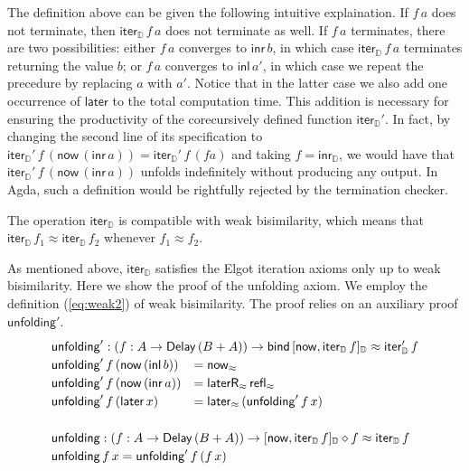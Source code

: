\documentclass[runningheads,a4paper]{llncs}
\newcommand{\inl}{\mathsf{inl}}
\newcommand{\inr}{\mathsf{inr}}
\newcommand{\Delay}{\ensuremath{\mathsf{Delay}\,}}
\newcommand{\now}{\mathsf{now}}
\newcommand{\later}{\mathsf{later}}
\newcommand{\laterR}{\mathsf{laterR}}
\newcommand{\bind}{\mathsf{bind}}
\newcommand{\D}{\mathbb{D}}
\newcommand{\copairD}[2]{[#1,#2]_{\D}}
\newcommand{\inrD}{\mathsf{inr}_{\D}}
\newcommand{\iterD}{\mathsf{iter}_\D}
\newcommand{\unfolding}{\mathsf{unfolding}}
\newcommand{\refl}{\mathsf{refl}}
\begin{document}
The definition above can be given the following intuitive
explaination. If $f\,a$ does not terminate, then $\iterD\,f\,a$ does
not terminate as well. If $f\,a$ terminates, there are two
possibilities: either $f\,a$ converges to $\inr\,b$, in which case
$\iterD\,f\,a$ terminates returning the value $b$; or $f\,a$ converges
to $\inl\,a'$, in which case we repeat the precedure by replacing $a$
with $a'$. Notice that in the latter case we also add one occurrence
of $\later$ to the total computation time. This addition is necessary
for ensuring the productivity of the corecursively defined function
$\iterD'$. In fact, by changing the second line of its specification to
$\iterD' \,f \,(\now \,(\inr\, a)) = \iterD' \,f \,(f a)$
and taking $f = \inrD$, we would have that $\iterD' \,f \,(\now
\,(\inr\, a))$ unfolds indefinitely without producing any output. In
Agda, such a definition would be rightfully rejected by the termination
checker. 

The operation $\iterD$ is compatible with weak bisimilarity, which means
that $\iterD\,f_1 \approx \iterD\,f_2$ whenever $f_1 \approx f_2$.

As mentioned above, $\iterD$ satisfies the Elgot iteration axioms only
up to weak bisimilarity. Here we show the proof of the unfolding
axiom. We employ the definition (\ref{eq:weak2}) of weak
bisimilarity. The proof relies on an auxiliary proof $\unfolding'$. 
\[
\def\arraystretch{1.2}
\begin{array}{ll}
\multicolumn{2}{l}{\unfolding' : (f : A \to \Delay (B + A)) \to
  \bind\, \copairD {\now}{\iterD \,f} \approx \iterD' \,f} \\
\unfolding' \,f \,(\now \,(\inl \,b)) & = \now_\approx \\
\unfolding' \,f \,(\now \,(\inr \,a)) & = \laterR_{\approx} \,
  \refl_\approx \\
\unfolding' \,f \,(\later \,x) & = \later_\approx \,(\unfolding'\, f\,
  x) \\
 \\
\multicolumn{2}{l}{\unfolding : (f : A \to \Delay (B + A)) \to
  \copairD {\now}{\iterD \,f}\diamond f \approx \iterD \,f}\\
\multicolumn{2}{l}{\unfolding \,f\,x = \unfolding'\,f\,(f\,x)}
\end{array}
\]
\end{document}
